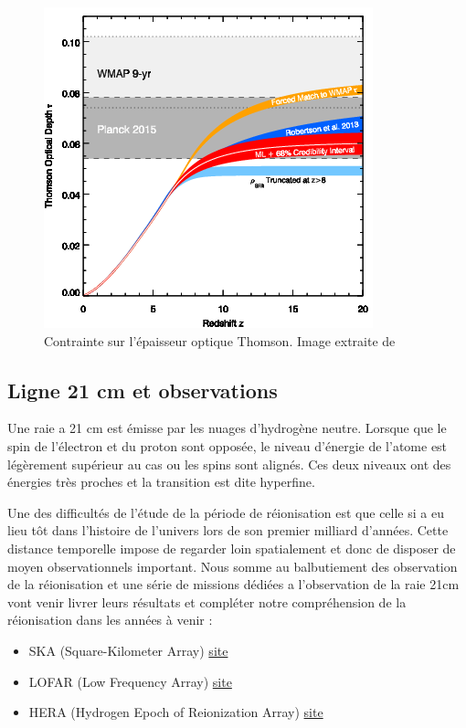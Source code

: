 \begin{figure}
        \includegraphics[width=.9\linewidth]{img/01/epaisseur_optique_thomson.png} 
        \caption[Epaisseur optique Thomson]{%
		Contrainte sur l'épaisseur optique Thomson.
        Image extraite de \cite{2015ApJ...802L..19R}
 		\label{fig:epaisseur_optique_thomson} }
\end{figure}

\subsection{Ligne 21 cm et observations}


Une raie a 21 cm est émisse par les nuages d'hydrogène neutre.
Lorsque que le spin de l'électron et du proton sont opposée, le niveau d'énergie de l'atome est légèrement supérieur au cas ou les spins sont alignés.
Ces deux niveaux ont des énergies très proches et la transition est dite hyperfine.


Une des difficultés de l’étude de la période de réionisation est que celle si a eu lieu tôt dans l'histoire de l'univers lors de son premier milliard d'années.
Cette distance temporelle impose de regarder loin spatialement et donc de disposer de moyen observationnels important.
Nous somme au balbutiement des observation de la réionisation et une série de missions dédiées a l'observation de la raie 21cm vont venir livrer leurs résultats et compléter notre compréhension de la réionisation dans les années à venir :
\begin{itemize}
\item SKA (Square-Kilometer Array) \href{https://skatelescope.org/}{site}
\item LOFAR (Low Frequency Array) \href{http://www.lofar.org/}{site}
\item HERA (Hydrogen Epoch of Reionization Array) \href{http://reionization.org/}{site}
\end{itemize}
%


